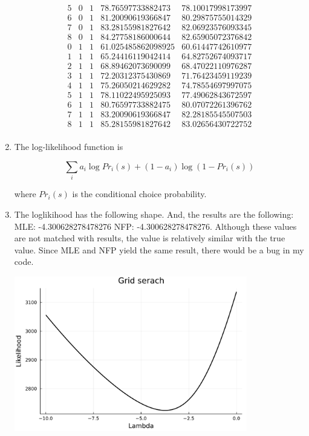 \documentclass{article}
\begin{document}
\begin{enumerate}
\begin{equation}
\begin{array}{ccccc}
        5 & 0 & 1 & 78.76597733882473 & 78.10017998173997 \\
        6 & 0 & 1 & 81.20090619366847 & 80.29875755014329 \\
        7 & 0 & 1 & 83.28155981827642 & 82.06923576093345 \\
        8 & 0 & 1 & 84.27758186000644 & 82.65905072376842 \\
        0 & 1 & 1 & 61.025485862098925 & 60.61447742610977 \\
        1 & 1 & 1 & 65.24416119042414 & 64.82752674093717 \\
        2 & 1 & 1 & 68.89462073690099 & 68.47022110976287 \\
        3 & 1 & 1 & 72.20312375430869 & 71.76423459119239 \\
        4 & 1 & 1 & 75.26050214629282 & 74.78554697997075 \\
        5 & 1 & 1 & 78.11022495925093 & 77.49062843672597 \\
        6 & 1 & 1 & 80.76597733882475 & 80.07072261396762 \\
        7 & 1 & 1 & 83.20090619366847 & 82.28185545507503 \\
        8 & 1 & 1 & 85.28155981827642 & 83.02656430722752 \\
      \end{array}
    \end{equation}

  \item The log-likelihood function is

    $$\sum_{i}a_i \log Pr_i(s) + (1-a_i) \log (1-Pr_i(s))$$

    where $Pr_i(s)$ is the conditional choice probability. 
  \item The loglikihood has the following shape. And, the results are the following: MLE: -4.300628278478276
  NFP: -4.300628278478276. Although these values are not matched with results, the value is relatively similar with the true value. Since MLE and NFP yield the same result, there would be a bug in my code.


    \begin{center}
    \includegraphics[width = 0.8\textwidth]{./Figures/Q4_grid.pdf}
  \end{center}

\end{enumerate}
\end{document}
